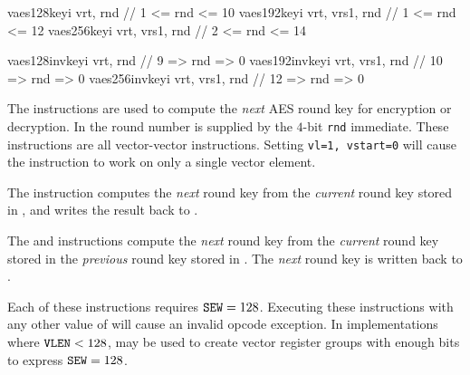 \begin{cryptoisa}
vaes128keyi     vrt,       rnd    // 1  <= rnd <= 10
vaes192keyi     vrt, vrs1, rnd    // 1  <= rnd <= 12
vaes256keyi     vrt, vrs1, rnd    // 2  <= rnd <= 14

vaes128invkeyi  vrt,       rnd    // 9  => rnd =>  0
vaes192invkeyi  vrt, vrs1, rnd    // 10 => rnd =>  0
vaes256invkeyi  vrt, vrs1, rnd    // 12 => rnd =>  0
\end{cryptoisa}

The  instructions
are used to compute the {\em next} AES round key for encryption
or decryption.
In the round number is supplied by the $4$-bit {\tt rnd} immediate.
These instructions are all vector-vector instructions.
Setting {\tt vl=1, vstart=0} will cause the instruction to work on only a
single vector element.

The  instruction computes
the {\em next} round key
from the
{\em current} round key
stored in \vrt,
and writes the result back to \vrt.

The  and  instructions
compute the {\em next} round key
from the
{\em current} round key stored in 
the {\em previous} round key stored in .
The {\em next} round key is written back to \vrt.

Each of these instructions requires ${\tt SEW}=128$.
Executing these instructions with any other value of \SEW will cause
an invalid opcode exception.
In implementations where ${\tt VLEN}<128$, \LMUL may be used to create
vector register groups with enough bits to express ${\tt SEW}=128$.

%
%
%
%
%
%
%
%
%
%
%
%
%


